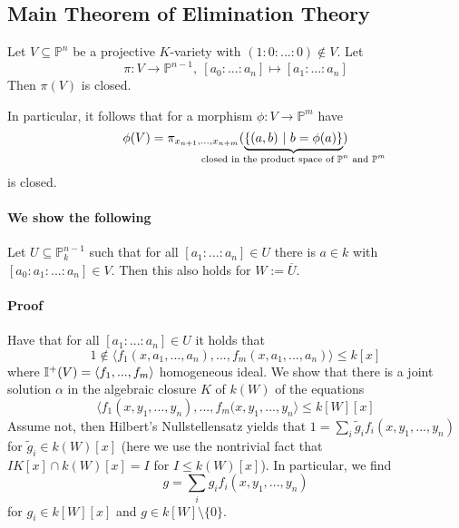 
\subsection{Main Theorem of Elimination Theory}
Let $V \subseteq \mathbb{P}^n$ be a projective $K$-variety with $(1 : 0 : ... : 0) \notin V$.
Let
\begin{equation*}
    \pi: V \to \mathbb{P}^{n - 1}, \ [a_0 : ... : a_n] \mapsto [a_1 : ... : a_n]
\end{equation*}
Then $\pi(V)$ is closed.

In particular, it follows that for a morphism $\phi: V \to \mathbb{P}^m$ have \
\begin{equation*}
    \phi(V) = \pi_{x_{n + 1}, ..., x_{n + m}}(\underbrace{\{ (a, b) \ | \ b = \phi(a) \}}_{\mathclap{\text{closed in the product space of $\mathbb{P}^n$ and $\mathbb{P}^m$}}})
\end{equation*}
is closed.

\paragraph{We show the following}
Let $U \subseteq \mathbb{P}^{n - 1}_k$ such that for all $[a_1 : ... : a_n] \in U$ there is $a \in k$ with $[a_0 : a_1 : ... : a_n] \in V$.
Then this also holds for $W := \overline{U}$.
\paragraph{Proof} 
Have that for all $[a_1 : ... : a_n] \in U$ it holds that
\begin{equation*}
    1 \notin \langle f_1(x, a_1, ..., a_n), ..., f_m(x, a_1, ..., a_n) \rangle \leq k[x]
\end{equation*}
where $\mathbb{I}^+(V) = \langle f_1, ..., f_m \rangle$ homogeneous ideal. 
We show that there is a joint solution $\alpha$ in the algebraic closure $K$ of $k(W)$ of the equations
\begin{equation*}
    \langle f_1(x, y_1, ..., y_n), ..., f_m(x, y_1, ..., y_n \rangle \leq k[W][x]
\end{equation*}
Assume not, then Hilbert's Nullstellensatz yields that $1 = \sum_i \tilde{g}_i f_i(x, y_1, ..., y_n)$ for $\tilde{g}_i \in k(W)[x]$
(here we use the nontrivial fact that $IK[x] \cap k(W)[x] = I$ for $I \leq k(W)[x]$).
In particular, we find
\begin{equation*}
    g = \sum_i g_i f_i(x, y_1, ..., y_n)
\end{equation*}
for $g_i \in k[W][x]$ and $g \in k[W] \setminus \{0\}$.

